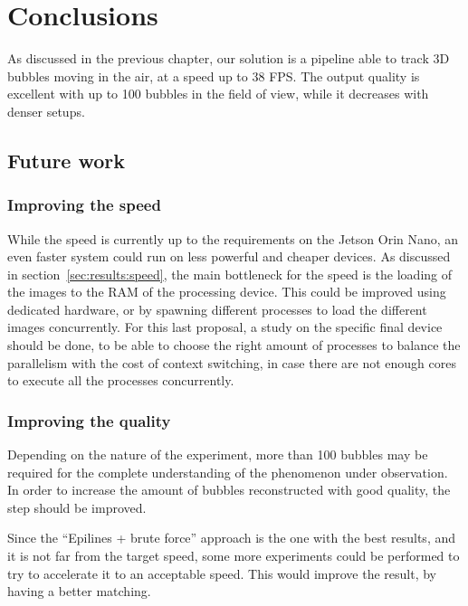 \chapter{Conclusions}
\label{chap:conclusions}

As discussed in the previous chapter, our solution is a pipeline able to track 3D bubbles moving in the air, at a speed up to 38 FPS.
The output quality is excellent with up to 100 bubbles in the field of view, while it decreases with denser setups.

\section{Future work}

\subsection{Improving the speed}

While the speed is currently up to the requirements on the Jetson Orin Nano, an even faster system could run on less powerful and cheaper devices.
As discussed in section~\ref{sec:results:speed}, the main bottleneck for the speed is the loading of the images to the RAM of the processing device.
This could be improved using dedicated hardware, or by spawning different processes to load the different images concurrently.
For this last proposal, a study on the specific final device should be done, to be able to choose the right amount of processes to balance the parallelism with the cost of context switching, in case there are not enough cores to execute all the processes concurrently.

\subsection{Improving the quality}

Depending on the nature of the experiment, more than 100 bubbles may be required for the complete understanding of the phenomenon under observation.
In order to increase the amount of bubbles reconstructed with good quality, the \match* step should be improved.

Since the ``Epilines + brute force'' approach is the one with the best results, and it is not far from the target speed, some more experiments could be performed to try to accelerate it to an acceptable speed.
This would improve the result, by having a better matching.

